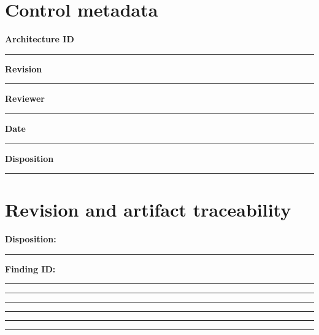\documentclass[11pt,letterpaper]{article}
\begin{document}
\makedoctitle\makedocsummary
\section{Control metadata}
\noindent\textbf{Architecture ID}\par\nobreak\vspace{6pt}\noindent\rule{0.93\linewidth}{0.4pt}\par\vspace{14pt}
\noindent\textbf{Revision}\par\nobreak\vspace{6pt}\noindent\rule{0.93\linewidth}{0.4pt}\par\vspace{14pt}
\noindent\textbf{Reviewer}\par\nobreak\vspace{6pt}\noindent\rule{0.93\linewidth}{0.4pt}\par\vspace{14pt}
\noindent\textbf{Date}\par\nobreak\vspace{6pt}\noindent\rule{0.93\linewidth}{0.4pt}\par\vspace{14pt}
\noindent\textbf{Disposition}\par\nobreak\vspace{6pt}\noindent\rule{0.93\linewidth}{0.4pt}\par\vspace{14pt}
\section{Revision and artifact traceability}
\noindent\textbf{Disposition:}\rule{2.5cm}{0.4pt}\quad\textbf{Finding ID:}\rule{4cm}{0.4pt}

\vspace{2mm}
\noindent\rule{0.93\linewidth}{0.4pt}\par\vspace{13pt}
\noindent\rule{0.93\linewidth}{0.4pt}\par\vspace{13pt}
\noindent\rule{0.93\linewidth}{0.4pt}\par\vspace{13pt}
\noindent\rule{0.93\linewidth}{0.4pt}\par\vspace{13pt}
\noindent\rule{0.93\linewidth}{0.4pt}\par\vspace{13pt}
\end{document}
